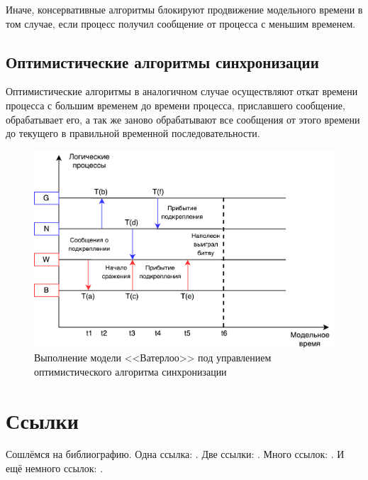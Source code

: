 Иначе, консервативные алгоритмы блокируют продвижение модельного времени в том случае, если процесс получил сообщение от процесса с меньшим временем.


\subsection{Оптимистические алгоритмы синхронизации} \label{subsect2}

Оптимистические алгоритмы в аналогичном случае осуществляют откат времени процесса с большим временем до времени процесса, приславшего сообщение, обрабатывает его, а так же заново обрабатывают все сообщения от этого времени до текущего в правильной временной последовательности.

\begin{figure}[!ht]
\centering
\includegraphics[scale=1]{images/waterloo-oas.pdf}
\caption{Выполнение модели <<Ватерлоо>> под управлением оптимистического алгоритма синхронизации}
\label{fig:Выполнение модели <<Ватерлоо>> под управлением оптимистического алгоритма синхронизации}
\end{figure}


\section{Ссылки} \label{sect1_2}
Сошлёмся на библиографию. Одна ссылка: \cite[с.~54]{Sokolov}\cite[с.~36]{Gaidaenko}. Две ссылки: \cite{Sokolov,Gaidaenko}. Много ссылок:  \cite[с.~54]{Lermontov,Management,Borozda} \cite{Lermontov,Management,Borozda,Marketing,Constitution,FamilyCode,Gost.7.0.53,Razumovski,Lagkueva,Pokrovski,Sirotko,Lukina,Methodology,Encyclopedia,Nasirova,Berestova,Kriger}. И ещё немного ссылок: \cite{Article,Book,Booklet,Conference,Inbook,Incollection,Manual,Mastersthesis,Misc,Phdthesis,Proceedings,Techreport,Unpublished}. \cite{medvedev2006jelektronnye, CEAT:CEAT581, doi:10.1080/01932691.2010.513279,Gosele1999161,Li2007StressAnalysis, Shoji199895,test:eisner-sample,AB_patent_Pomerantz_1968,iofis_patent1960}

